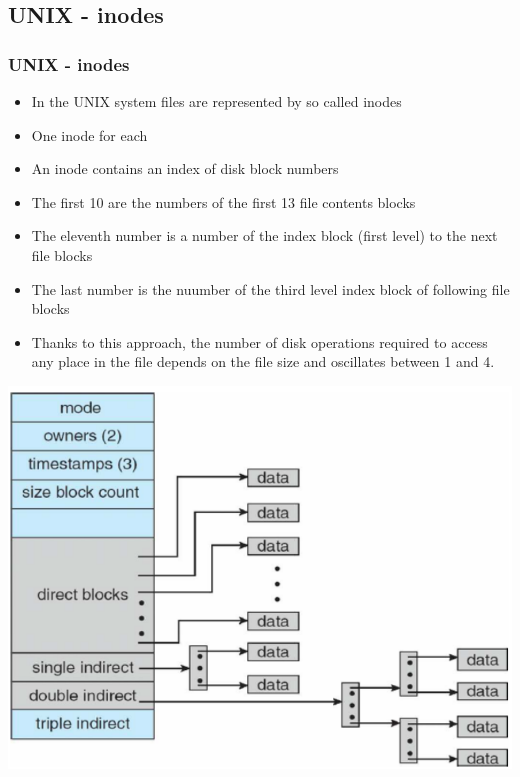 \documentclass{beamer}
\begin{document}
\subsection{UNIX - inodes}
\begin{frame}[allowframebreaks]
\frametitle{UNIX - inodes}
\begin{itemize}
\item In the UNIX system files are represented by so called inodes
\item One inode for each
\item An inode contains an index of disk block numbers
\item The first 10 are the numbers of the first 13 file contents blocks
\item The eleventh number is a number of the index block (first level) to the next file blocks
\item The last number is the nuumber of the third level index block of following file blocks
\item Thanks to this approach, the number of disk operations required to access any place in the file depends on the file size and oscillates between 1 and 4.
\end{itemize}
\includegraphics[scale=0.45]{inodes.png}
\end{frame}
\end{document}
